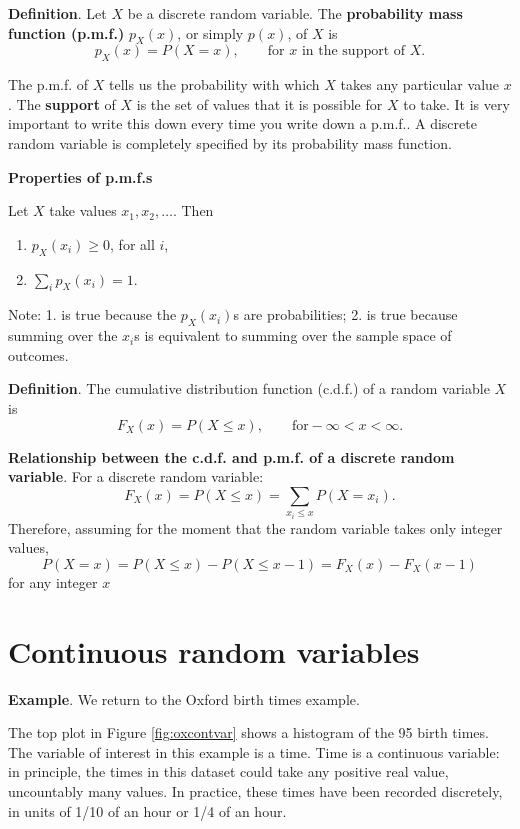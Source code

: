 \documentclass[
  british,
]{book}
\providecommand{\tightlist}{%
  \setlength{\itemsep}{0pt}\setlength{\parskip}{0pt}}
\begin{document}
\textbf{Definition}. Let \(X\) be a discrete random variable. The \textbf{probability mass function (p.m.f.)} \(p_X(x)\), or simply \(p(x)\), of \(X\) is
\[ p_X(x) = P(X=x), \qquad \mbox{for $x$ in the support of $X$}.  \]

The p.m.f. of \(X\) tells us the probability with which \(X\) takes any particular value \(x\). The \textbf{support} of \(X\) is the set of values that it is possible for \(X\) to take. It is very important to write this down every time you write down a p.m.f.. A discrete random variable is completely specified by its probability mass function.

\textbf{Properties of p.m.f.s}

Let \(X\) take values \(x_1, x_2,\ldots.\) Then

\begin{enumerate}
\def\labelenumi{\arabic{enumi}.}
\tightlist
\item
  \(p_X(x_i) \geq 0\), for all \(i\),
\item
  \(\displaystyle\sum_i p_X(x_i) = 1\).
\end{enumerate}

Note: 1. is true because the \(p_X(x_i)\)s are probabilities; 2. is true because summing over the \(x_i\)s is equivalent to summing over the sample space of outcomes.

\textbf{Definition}. The cumulative distribution function (c.d.f.) of a random variable \(X\) is
\[ F_X(x) = P(X \leq x), \qquad \mbox{for} -\infty < x < \infty. \]

\textbf{Relationship between the c.d.f. and p.m.f. of a discrete random variable}. For a discrete random variable:
\[ F_X(x) = P(X \leq x) = \sum_{x_i \leq x} P(X = x_i). \]
Therefore, assuming for the moment that the random variable takes only integer values,
\[ P(X=x) = P(X \leq x) - P(X \leq x-1) = F_X(x) - F_X(x-1) \]
for any integer \(x\)

\hypertarget{continuous}{%
\section{Continuous random variables}\label{continuous}}

\textbf{Example}. We return to the Oxford birth times example.

The top plot in Figure \ref{fig:oxcontvar} shows a histogram of the 95 birth times. The variable of interest in this example is a time. Time is a continuous variable: in principle, the times in this dataset could take any positive real value, uncountably many values. In practice, these times have been recorded discretely, in units of 1/10 of an hour or 1/4 of an hour.
\end{document}
